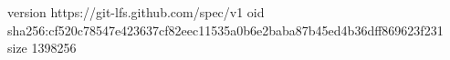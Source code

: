 version https://git-lfs.github.com/spec/v1
oid sha256:cf520c78547e423637cf82eec11535a0b6e2baba87b45ed4b36dff869623f231
size 1398256
